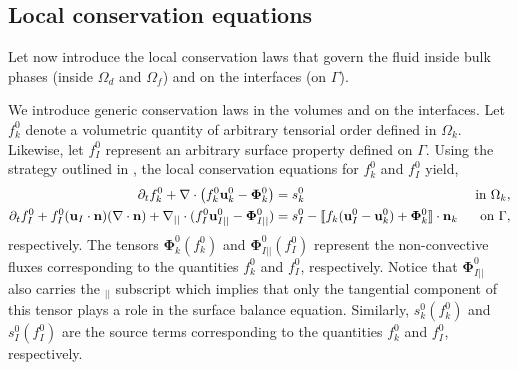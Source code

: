 \subsection{Local conservation equations}
\label{sec:local_eq}
Let now introduce the local conservation laws that govern the fluid inside bulk phases (inside $\Omega_d$ and $\Omega_f$) and on the interfaces (on $\Gamma$). 


We introduce generic conservation laws in the volumes and on the interfaces. 
Let $f_k^0$ denote a volumetric quantity of arbitrary tensorial order defined in $\Omega_k$.
Likewise, let $f_I^0$ represent an arbitrary surface property defined on $\Gamma$.
Using the strategy outlined in \citep{ishii2010thermo,bothe2022sharp}, the local conservation equations for $f_k^0$ and $f_I^0$ yield,  
\begin{align}
    \label{eq:dt_f_k}
    \partial_t f_k^0
    +\mathbf{\nabla}\cdot \left(
        f_k^0\textbf{u}_k^0
        - \mathbf{\Phi}_k^0
        \right)
    &= 
    s_k^0
    & \text{ in } \Omega_k,&\\
    \partial_t f_I^0 
    + f_I^0 (\textbf{u}_I \cdot \textbf{n})(\mathbf{\nabla}\cdot \textbf{n})
    +\mathbf{\nabla}_{||}\cdot
    (f_I^0 \textbf{u}_{I||}^0
        - \mathbf{\Phi}_{I||}^0 )
    &= 
    s_I^0
    - \llbracket 
       f_k (\textbf{u}_I^0 - \textbf{u}_k^0)
       + \mathbf{\Phi}_k^0
     \rrbracket \cdot \textbf{n}_k 
    & \text{ on } \Gamma,&
    \label{eq:dt_f_I}
\end{align}
respectively.
The tensors $\mathbf{\Phi}_k^0(f_k^0)$ and $\mathbf{\Phi}_{I||}^0(f_I^0)$ represent the non-convective fluxes corresponding to the quantities $f_k^0$ and $f_I^0$, respectively. 
Notice that $\mathbf{\Phi}_{I||}^0$ also carries the $_{||}$ subscript which implies that only the tangential component of this tensor plays a role in the surface balance equation. 
Similarly, $s_k^0(f_k^0)$ and $s_I^0(f_I^0)$ are the source terms corresponding to the quantities $f_k^0$ and $f_I^0$, respectively.


